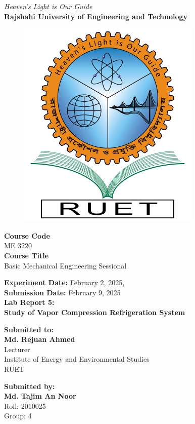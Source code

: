 \vspace*{\fill}
\begin{center}

    \emph{Heaven's Light is Our Guide} \\
    \textbf{Rajshahi University of Engineering and Technology} \\

    \begin{figure}[H]
        \centering
        \includegraphics[scale=.34]{images/RUET_logo.png}
        \label{fig:ruet_logo}
    \end{figure}
    \vspace{5mm}

    \textbf{Course Code}\\
    ME 3220\\
    \vspace{3mm}
    \textbf{Course Title}\\
    Basic Mechanical Engineering Sessional

    \vspace{5mm}
    \textbf{Experiment Date:} {February 2, 2025},\\
    \textbf{Submission Date:} {February 9, 2025}\\

    \vspace{5mm}
    \textbf{Lab Report 5: \\
        Study of Vapor Compression Refrigeration System}

    \vspace{10mm}

    \textbf{Submitted to:} \\
    \textbf{Md. Rejuan Ahmed} \\
    Lecturer \\
    Institute of Energy and Environmental Studies \\
    RUET
    \vspace{8mm}

    \textbf{Submitted by:} \\
    \textbf{Md. Tajim An Noor} \\
    Roll: 2010025\\
    Group: 4

\end{center}
\vspace*{\fill}
